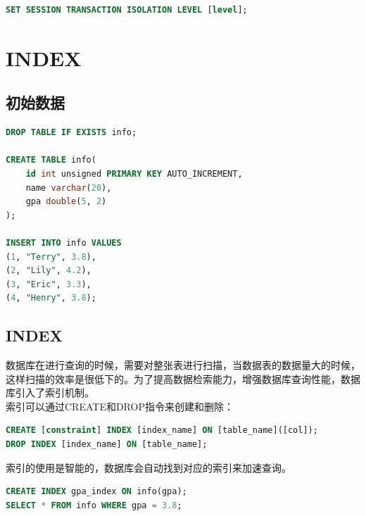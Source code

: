 \documentclass[12pt, openany, oneside]{book}
\begin{document}
\begin{lstlisting}[language=SQL]
SET SESSION TRANSACTION ISOLATION LEVEL [level];
\end{lstlisting}

\newpage

\chapter{INDEX}

\section{初始数据}


\begin{lstlisting}[language=SQL]
DROP TABLE IF EXISTS info;

CREATE TABLE info(
    id int unsigned PRIMARY KEY AUTO_INCREMENT,
    name varchar(20),
    gpa double(5, 2)
);

INSERT INTO info VALUES
(1, "Terry", 3.8),
(2, "Lily", 4.2),
(3, "Eric", 3.3),
(4, "Henry", 3.8);
\end{lstlisting}

\vspace{0.5cm}

\section{INDEX}

数据库在进行查询的时候，需要对整张表进行扫描，当数据表的数据量大的时候，这样扫描的效率是很低下的。为了提高数据检索能力，增强数据库查询性能，数据库引入了索引机制。\\

索引可以通过CREATE和DROP指令来创建和删除：

\vspace{-0.5cm}

\begin{lstlisting}[language=SQL]
CREATE [constraint] INDEX [index_name] ON [table_name]([col]);
DROP INDEX [index_name] ON [table_name];
\end{lstlisting}

索引的使用是智能的，数据库会自动找到对应的索引来加速查询。\\


\begin{lstlisting}[language=SQL]
CREATE INDEX gpa_index ON info(gpa);
SELECT * FROM info WHERE gpa = 3.8;
\end{lstlisting}
\end{document}
